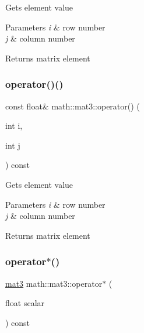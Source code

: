 Gets element value 
\begin{DoxyParams}{Parameters}
{\em i} & row number \\
\hline
{\em j} & column number \\
\hline
\end{DoxyParams}
\begin{DoxyReturn}{Returns}
matrix element 
\end{DoxyReturn}
\mbox{\label{structmath_1_1mat3_af4211016916b51064cb63ca8154556cb}} 
\subsubsection{\texorpdfstring{operator()()}{operator()()}\hspace{0.1cm}{\footnotesize\ttfamily [2/2]}}
{\footnotesize\ttfamily const float\& math\+::mat3\+::operator() (\begin{DoxyParamCaption}\item[{int}]{i,  }\item[{int}]{j }\end{DoxyParamCaption}) const\hspace{0.3cm}{\ttfamily [inline]}}

Gets element value 
\begin{DoxyParams}{Parameters}
{\em i} & row number \\
\hline
{\em j} & column number \\
\hline
\end{DoxyParams}
\begin{DoxyReturn}{Returns}
matrix element 
\end{DoxyReturn}
\mbox{\label{structmath_1_1mat3_a91f1b69ebda27ee6865e0b1ea5c6c6fb}} 
\subsubsection{\texorpdfstring{operator$\ast$()}{operator*()}\hspace{0.1cm}{\footnotesize\ttfamily [1/2]}}
{\footnotesize\ttfamily \hyperlink{structmath_1_1mat3}{mat3} math\+::mat3\+::operator$\ast$ (\begin{DoxyParamCaption}\item[{float}]{scalar }\end{DoxyParamCaption}) const\hspace{0.3cm}{\ttfamily [inline]}}

